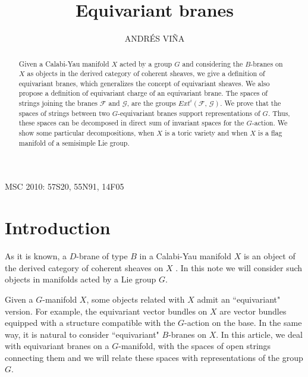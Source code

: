 \documentclass[xypic,amscd,syntonly,amssymb,verbatim,12pt]{amsart}
\theoremstyle{plain}
\theoremstyle{definition}
\theoremstyle{remark}
\numberwithin{equation}{section}
\begin{document}
 
 \title{Equivariant branes}




 \author{ ANDR\'{E}S   VI\~{N}A}
\address{Departamento de F\'{i}sica. Universidad de Oviedo.   Avda Calvo
 Sotelo.     33007 Oviedo. Spain. }






 \maketitle
\begin{abstract}
 
 
 Given a Calabi-Yau manifold $X$ acted by a group $G$ and considering
 the $B$-branes on $X$ as objects in the derived
 category of coherent sheaves, we give a definition of equivariant
branes, which generalizes the concept of equivariant sheaves.
We also propose a definition of equivariant charge of an equivariant
brane. The spaces of strings joining
 the branes ${\mathcal F}$ and ${\mathcal G}$, are the
  groups $Ext^i({\mathcal F},\,{\mathcal G})$.
 We prove that  the spaces of strings between two
$G$-equivariant branes  support representations of $G$.
 Thus, these spaces can be decomposed in
  direct sum of invariant spaces for the $G$-action. We show some
  particular decompositions, when $X$ is a toric variety and when $X$
  is a flag manifold of a semisimple Lie group.







\end{abstract}
   \smallskip
 MSC 2010: 57S20, 55N91, 14F05


\section {Introduction} \label{S:intro}

 As it is known, a
$D$-brane of type $B$ in a Calabi-Yau manifold $X$ is an object of
the derived category of coherent sheaves on $X$
\cite{Aspin,Aspin-et,Aspin-Law,Douglas,Katz,Sharpe}. In this note we will
consider   such objects in manifolds acted by a Lie group $G$.

Given a $G$-manifold $X$, some objects related  with $X$ admit an ``equivariant" version. For example,
 the equivariant vector bundles on $X$  are vector bundles equipped with a structure
compatible with the $G$-action on the base. In the same way,
 it is natural to consider ``equivariant"
$B$-branes on $X$. In this article, we deal with  equivariant branes on a $G$-manifold,
 with the spaces of open strings connecting them and we will
relate these spaces with representations of the group $G$.
\end{document}
